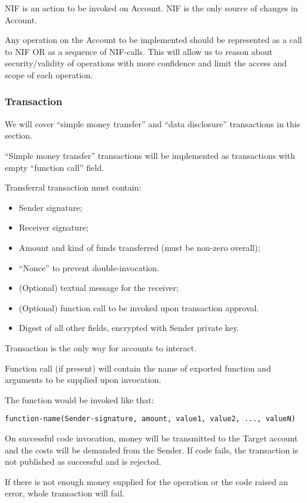 NIF is an action to be invoked on Account.
NIF is the only source of changes in Account.

Any operation on the Account to be implemented should be represented as a call to NIF OR as a sequence of NIF-calls.
This will allow us to reason about security/validity of operations with more confidence and limit the access and scope of each operation.

\subsubsection{Transaction}

We will cover ``simple money transfer'' and ``data disclosure'' transactions in this section.

``Simple money transfer'' transactions will be implemented as transactions with empty ``function call'' field.

Transferral transaction must contain:
\begin{itemize}
  \item Sender signature;
  \item Receiver signature;
  \item Amount and kind of funds transferred (must be non-zero overall);
  \item ``Nonce'' to prevent double-invocation.
  \item (Optional) textual message for the receiver;
  \item (Optional) function call to be invoked upon transaction approval.
  \item Digest of all other fields, encrypted with Sender private key.
\end{itemize}

Transaction is the only way for accounts to interact.

Function call (if present) will contain the name of exported function and arguments to be supplied upon invocation.

The function would be invoked like that:

\begin{verbatim}
function-name(Sender-signature, amount, value1, value2, ..., valueN)
\end{verbatim}

On successful code invocation, money will be transmitted to the Target account and the costs will be demanded from the Sender.
If code fails, the transaction is not published as successful and is rejected.

If there is not enough money supplied for the operation or the code raised an error, whole transaction will fail.

